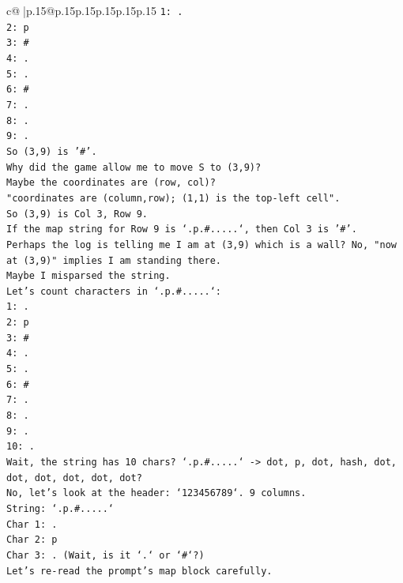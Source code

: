 \documentclass{article}
\begin{document}
{\begin{supertabular}{c@{$\;$}|p{.15\linewidth}@{}p{.15\linewidth}p{.15\linewidth}p{.15\linewidth}p{.15\linewidth}p{.15\linewidth}}
{{{\texttt{1: .} \\
\texttt{2: p} \\
\texttt{3: \#} \\
\texttt{4: .} \\
\texttt{5: .} \\
\texttt{6: \#} \\
\texttt{7: .} \\
\texttt{8: .} \\
\texttt{9: .} \\
\texttt{So (3,9) is '\#'.} \\
\texttt{Why did the game allow me to move S to (3,9)?} \\
\texttt{Maybe the coordinates are (row, col)?} \\
\texttt{"coordinates are (column,row); (1,1) is the top{-}left cell".} \\
\texttt{So (3,9) is Col 3, Row 9.} \\
\texttt{If the map string for Row 9 is `.p.\#.....`, then Col 3 is '\#'.} \\
\texttt{Perhaps the log is telling me I am at (3,9) which is a wall? No, "now at (3,9)" implies I am standing there.} \\
\texttt{Maybe I misparsed the string.} \\
\texttt{Let's count characters in `.p.\#.....`:} \\
\texttt{1: .} \\
\texttt{2: p} \\
\texttt{3: \#} \\
\texttt{4: .} \\
\texttt{5: .} \\
\texttt{6: \#} \\
\texttt{7: .} \\
\texttt{8: .} \\
\texttt{9: .} \\
\texttt{10: .} \\
\texttt{Wait, the string has 10 chars? `.p.\#.....` {-}> dot, p, dot, hash, dot, dot, dot, dot, dot, dot?} \\
\texttt{No, let's look at the header: `123456789`. 9 columns.} \\
\texttt{String: `.p.\#.....`} \\
\texttt{Char 1: .} \\
\texttt{Char 2: p} \\
\texttt{Char 3: . (Wait, is it `.` or `\#`?)} \\
\texttt{Let's re{-}read the prompt's map block carefully.} \\
}}}
\end{supertabular}}
\end{document}
